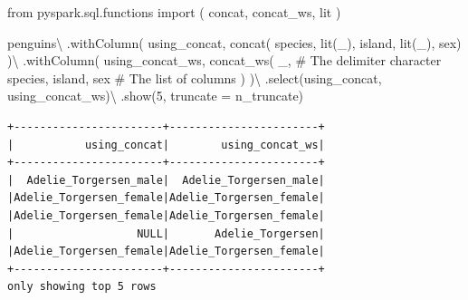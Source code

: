 \documentclass[
  11pt,
  letterpaper,
  DIV=11,
  numbers=noendperiod]{scrreprt}
\newenvironment{Shaded}{\begin{snugshade}}{\end{snugshade}}
\newcommand{\CommentTok}[1]{\textcolor[rgb]{0.37,0.37,0.37}{#1}}
\newcommand{\DecValTok}[1]{\textcolor[rgb]{0.68,0.00,0.00}{#1}}
\newcommand{\ImportTok}[1]{\textcolor[rgb]{0.00,0.46,0.62}{#1}}
\newcommand{\NormalTok}[1]{\textcolor[rgb]{0.00,0.23,0.31}{#1}}
\newcommand{\OperatorTok}[1]{\textcolor[rgb]{0.37,0.37,0.37}{#1}}
\newcommand{\StringTok}[1]{\textcolor[rgb]{0.13,0.47,0.30}{#1}}
\begin{document}
\begin{Shaded}
\begin{Highlighting}[]
\ImportTok{from}\NormalTok{ pyspark.sql.functions }\ImportTok{import}\NormalTok{ (}
\NormalTok{    concat,}
\NormalTok{    concat\_ws,}
\NormalTok{    lit}
\NormalTok{)}

\NormalTok{penguins}\OperatorTok{\textbackslash{}}
\NormalTok{    .withColumn(}
        \StringTok{\textquotesingle{}using\_concat\textquotesingle{}}\NormalTok{,}
\NormalTok{        concat(}
            \StringTok{\textquotesingle{}species\textquotesingle{}}\NormalTok{, lit(}\StringTok{\textquotesingle{}\_\textquotesingle{}}\NormalTok{), }\StringTok{\textquotesingle{}island\textquotesingle{}}\NormalTok{,}
\NormalTok{            lit(}\StringTok{\textquotesingle{}\_\textquotesingle{}}\NormalTok{), }\StringTok{\textquotesingle{}sex\textquotesingle{}}\NormalTok{)}
\NormalTok{    )}\OperatorTok{\textbackslash{}}
\NormalTok{    .withColumn(}
        \StringTok{\textquotesingle{}using\_concat\_ws\textquotesingle{}}\NormalTok{,}
\NormalTok{        concat\_ws(}
            \StringTok{\textquotesingle{}\_\textquotesingle{}}\NormalTok{, }\CommentTok{\# The delimiter character}
            \StringTok{\textquotesingle{}species\textquotesingle{}}\NormalTok{, }\StringTok{\textquotesingle{}island\textquotesingle{}}\NormalTok{, }\StringTok{\textquotesingle{}sex\textquotesingle{}} \CommentTok{\# The list of columns}
\NormalTok{        )}
\NormalTok{    )}\OperatorTok{\textbackslash{}}
\NormalTok{    .select(}\StringTok{\textquotesingle{}using\_concat\textquotesingle{}}\NormalTok{, }\StringTok{\textquotesingle{}using\_concat\_ws\textquotesingle{}}\NormalTok{)}\OperatorTok{\textbackslash{}}
\NormalTok{    .show(}\DecValTok{5}\NormalTok{, truncate }\OperatorTok{=}\NormalTok{ n\_truncate)}
\end{Highlighting}
\end{Shaded}

\begin{verbatim}
+-----------------------+-----------------------+
|           using_concat|        using_concat_ws|
+-----------------------+-----------------------+
|  Adelie_Torgersen_male|  Adelie_Torgersen_male|
|Adelie_Torgersen_female|Adelie_Torgersen_female|
|Adelie_Torgersen_female|Adelie_Torgersen_female|
|                   NULL|       Adelie_Torgersen|
|Adelie_Torgersen_female|Adelie_Torgersen_female|
+-----------------------+-----------------------+
only showing top 5 rows
\end{verbatim}
\end{document}
